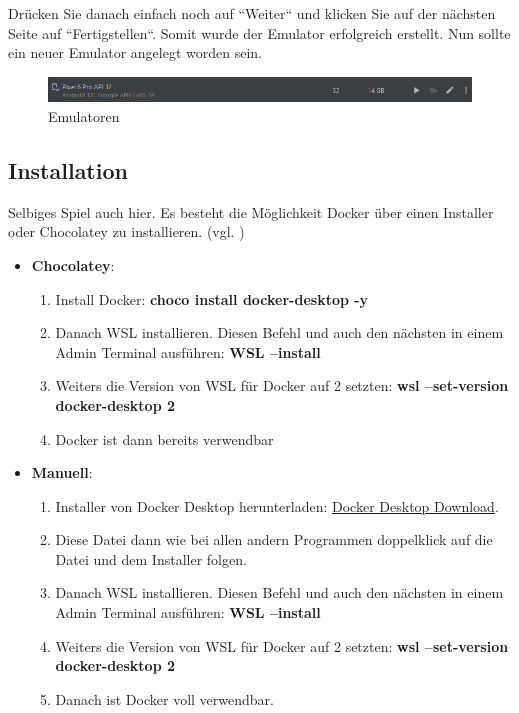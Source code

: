 Drücken Sie danach einfach noch auf ``Weiter`` und klicken Sie auf der nächsten Seite auf ``Fertigstellen``. Somit wurde der Emulator erfolgreich erstellt. Nun sollte ein neuer Emulator angelegt worden sein.
\begin{figure}[!h]
\centering
\includegraphics[width=1\textwidth]{FLUTTER/images/ZB/android_studio_devices.png}
\caption{Emulatoren}
\end{figure}

\newpage

\subsection{Installation}
Selbiges Spiel auch hier. Es besteht die Möglichkeit Docker über einen Installer oder Chocolatey zu installieren. (vgl. \cite{Docker})
\begin{itemize}
    \item \textbf{Chocolatey}:
    \begin{enumerate}
        \item Install Docker: \textbf{choco install docker-desktop -y}
        \item Danach WSL installieren. Diesen Befehl und auch den nächsten in einem Admin Terminal ausführen: \textbf{WSL --install}
        \item Weiters die Version von WSL für Docker auf 2 setzten: \textbf{ wsl --set-version docker-desktop 2}
        \item Docker ist dann bereits verwendbar
    \end{enumerate}

    \item \textbf{Manuell}:
    \begin{enumerate}
        \item Installer von Docker Desktop herunterladen: \href{https://desktop.docker.com/win/main/amd64/Docker%20Desktop%20Installer.exe}{Docker Desktop Download}.
        \item Diese Datei dann wie bei allen andern Programmen doppelklick auf die Datei und dem Installer folgen.
        \item Danach WSL installieren. Diesen Befehl und auch den nächsten in einem Admin Terminal ausführen: \textbf{WSL --install}
        \item Weiters die Version von WSL für Docker auf 2 setzten: \textbf{ wsl --set-version docker-desktop 2}
        \item Danach ist Docker voll verwendbar.
    \end{enumerate}
\end{itemize}

